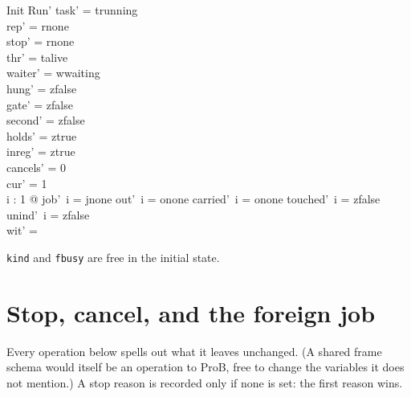 \documentclass[a4paper,10pt,fleqn]{article}
\newcommand{\field}[1]{\texttt{#1}}
\begin{document}
\begin{schema}{Init}
Run'
\where
task' = trunning \\
rep' = rnone \\
stop' = rnone \\
thr' = talive \\
waiter' = wwaiting \\
hung' = zfalse \\
gate' = zfalse \\
second' = zfalse \\
holds' = ztrue \\
inreg' = ztrue \\
cancels' = 0 \\
cur' = 1 \\
\forall i : 1  @ job'~i = jnone \land out'~i = onone \land carried'~i = onone \land
  touched'~i = zfalse \land unind'~i = zfalse \\
wit' = \emptyset
\end{schema}

\field{kind} and \field{fbusy} are free in the initial state.

\section{Stop, cancel, and the foreign job}
\label{sec:stop}

Every operation below spells out what it leaves unchanged. (A shared frame
schema would itself be an operation to ProB, free to change the variables it
does not mention.) A stop reason is recorded only if none is set: the first
reason wins.
\end{document}
